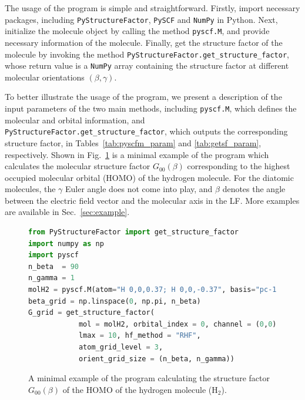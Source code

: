 \documentclass[preprint,12pt]{elsarticle} %
\renewcommand{\rm}[1]{\mathrm{#1}}    %
\begin{document}
The usage of the program is simple and straightforward.
Firstly, import necessary packages, including \texttt{PyStructureFactor}, \texttt{PySCF} and \texttt{NumPy} in Python.
Next, initialize the molecule object by calling the method \texttt{pyscf.M}, and provide necessary information of the molecule.
Finally, get the structure factor of the molecule by invoking the method \texttt{PyStructureFactor.get\_structure\_factor}, whose return value is a \texttt{NumPy} array containing the structure factor at different molecular orientations $(\beta,\gamma)$.

To better illustrate the usage of the program, we present a description of the input parameters of the two main methods, including \texttt{pyscf.M}, which defines the molecular and orbital information, and \texttt{PyStructureFactor.get\_structure\_factor}, which outputs the corresponding structure factor, in Tables~\ref{tab:pyscfm_param} and \ref{tab:getsf_param}, respectively.
Shown in Fig.~\ref{fig:code_example} is a minimal example of the program which calculates the molecular structure factor $G_{00}(\beta)$ corresponding to the highest occupied molecular orbital (HOMO) of the hydrogen molecule. For the diatomic molecules, the $\gamma$ Euler angle does not come into play, and $\beta$ denotes the angle between the electric field vector and the molecular axis in the LF.
More examples are available in Sec.~\ref{sec:example}.

\begin{figure}[tb]
    \begin{lstlisting}[language=Python, basicstyle=\footnotesize\ttfamily, breaklines=true, keywordstyle=\color{blue}, stringstyle=\color{purple}, commentstyle=\color{gray}, frame=tb, framesep=1em]
from PyStructureFactor import get_structure_factor
import numpy as np
import pyscf
n_beta  = 90
n_gamma = 1
molH2 = pyscf.M(atom="H 0,0,0.37; H 0,0,-0.37", basis="pc-1", spin=0)
beta_grid = np.linspace(0, np.pi, n_beta)
G_grid = get_structure_factor(
            mol = molH2, orbital_index = 0, channel = (0,0),
            lmax = 10, hf_method = "RHF",
            atom_grid_level = 3,
            orient_grid_size = (n_beta, n_gamma))
    \end{lstlisting}
    \caption{A minimal example of the program calculating the structure factor $G_{00}(\beta)$ of the HOMO of the hydrogen molecule ($\rm{H}_2$).}
    \label{fig:code_example}
\end{figure}
\end{document}

